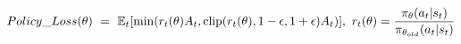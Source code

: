 $$Policy\_Loss(\theta) \ = \ \mathbb{E}_t[\min(r_t(\theta)A_t, {\rm clip}(r_t(\theta), 1 - \epsilon, 1 + \epsilon)A_t)], \ r_t(\theta) = \frac{\pi_{\theta}(a_t|s_t)}{\pi_{\theta_{old}}(a_t|s_t)}$$


